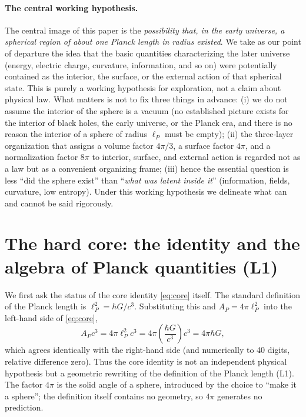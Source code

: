 \documentclass[11pt,a4paper]{article}
\newcommand{\eP}{\ell_P}
\begin{document}
\paragraph{The central working hypothesis.}
The central image of this paper is the \emph{possibility that, in the early universe, a spherical region of about one Planck length in radius existed}. We take as our point of departure the idea that the basic quantities characterizing the later universe (energy, electric charge, curvature, information, and so on) were potentially contained as the interior, the surface, or the external action of that spherical state. This is purely a working hypothesis for exploration, not a claim about physical law. What matters is not to fix three things in advance: (i) we do not assume the interior of the sphere is a vacuum (no established picture exists for the interior of black holes, the early universe, or the Planck era, and there is no reason the interior of a sphere of radius $\eP$ must be empty); (ii) the three-layer organization that assigns a volume factor $4\pi/3$, a surface factor $4\pi$, and a normalization factor $8\pi$ to interior, surface, and external action is regarded not as a law but as a convenient organizing frame; (iii) hence the essential question is less ``did the sphere exist'' than ``\emph{what was latent inside it}'' (information, fields, curvature, low entropy). Under this working hypothesis we delineate what can and cannot be said rigorously.

\section{The hard core: the identity and the algebra of Planck quantities (L1)}
We first ask the status of the core identity \eqref{eq:core} itself. The standard definition of the Planck length is $\eP^2 = \hbar G/c^3$. Substituting this and $A_P = 4\pi\eP^2$ into the left-hand side of \eqref{eq:core},
\begin{equation}
A_P c^3 = 4\pi\eP^2 c^3 = 4\pi\!\left(\frac{\hbar G}{c^3}\right)\! c^3 = 4\pi\hbar G,
\end{equation}
which agrees identically with the right-hand side (and numerically to 40 digits, relative difference zero). Thus the core identity is not an independent physical hypothesis but a geometric rewriting of the definition of the Planck length (L1). The factor $4\pi$ is the solid angle of a sphere, introduced by the choice to ``make it a sphere''; the definition itself contains no geometry, so $4\pi$ generates no prediction.
\end{document}
